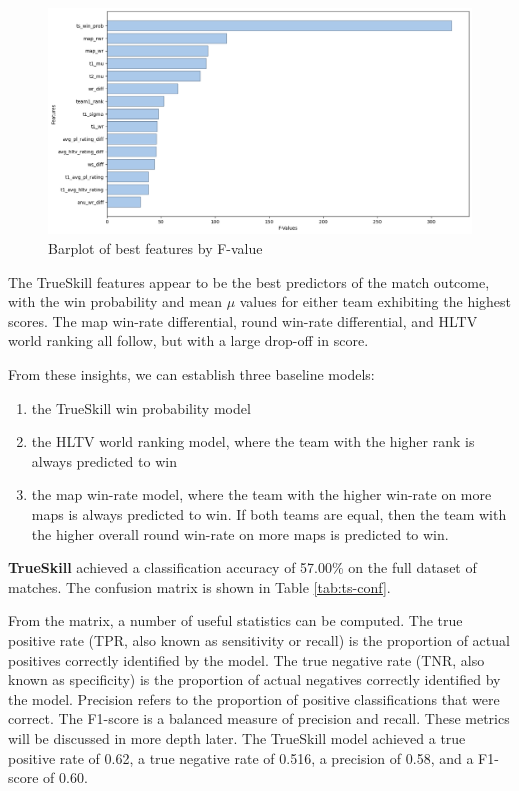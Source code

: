 \begin{figure}[h]
	\centering
	\begin{adjustbox}{center} %
		\includegraphics[width=1.3\textwidth]{Figures/f-statistik.png}
	\end{adjustbox}
	\caption{Barplot of best features by F-value}
	\label{fig:f-stat}
\end{figure}

The TrueSkill features appear to be the best predictors of the match outcome, with the win probability and mean $\mu$ values for either team exhibiting the highest scores. The map win-rate differential, round win-rate differential, and HLTV world ranking all follow, but with a large drop-off in score.

From these insights, we can establish three baseline models:

\begin{enumerate}
	\item the TrueSkill win probability model
	\item the HLTV world ranking model, where the team with the higher rank is always predicted to win
	\item the map win-rate model, where the team with the higher win-rate on more maps is always predicted to win. If both teams are equal, then the team with the higher overall round win-rate on more maps is predicted to win.
\end{enumerate}

\textbf{TrueSkill} achieved a classification accuracy of 57.00\% on the full dataset of \matchesTotal{} matches. The confusion matrix is shown in Table \ref{tab:ts-conf}. 

From the matrix, a number of useful statistics can be computed. The true positive rate (TPR, also known as sensitivity or recall) is the proportion of actual positives correctly identified by the model. The true negative rate (TNR, also known as specificity) is the proportion of actual negatives correctly identified by the model. Precision refers to the proportion of positive classifications that were correct. The F1-score is a balanced measure of precision and recall. These metrics will be discussed in more depth later. The TrueSkill model achieved a true positive rate of 0.62, a true negative rate of 0.516, a precision of 0.58, and a F1-score of 0.60.

